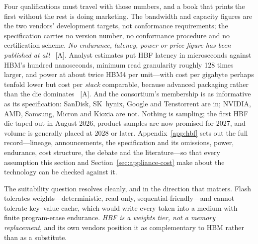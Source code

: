 Four qualifications must travel with those numbers, and a book that prints the first without the rest is doing marketing. The bandwidth and capacity figures are the two vendors' development targets, not conformance requirements; the specification carries no version number, no conformance procedure and no certification scheme. \emph{No endurance, latency, power or price figure has been published at all}~\cite{hbf-critique} [A]. Analyst estimates put HBF latency in microseconds against HBM's hundred nanoseconds, minimum read granularity roughly 128 times larger, and power at about twice HBM4 per unit---with cost per gigabyte perhaps tenfold lower but cost per \emph{stack} comparable, because advanced packaging rather than the die dominates~\cite{hbf-analysis} [A]. And the consortium's membership is as informative as its specification: SanDisk, SK~hynix, Google and Tenstorrent are in; NVIDIA, AMD, Samsung, Micron and Kioxia are not. Nothing is sampling; the first HBF die taped out in August 2026, product samples are now promised for 2027, and volume is generally placed at 2028 or later. Appendix~\ref{app:hbf} sets out the full record---lineage, announcements, the specification and its omissions, power, endurance, cost structure, the debate and the literature---so that every assumption this section and Section~\ref{sec:appliance-cost} make about the technology can be checked against it.

The suitability question resolves cleanly, and in the direction that matters. Flash tolerates weights---deterministic, read-only, sequential-friendly---and cannot tolerate key--value cache, which would write every token into a medium with finite program-erase endurance. \emph{HBF is a weights tier, not a memory replacement}, and its own vendors position it as complementary to HBM rather than as a substitute.

